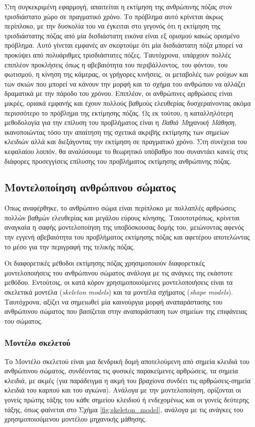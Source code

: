 Στη συγκεκριμένη εφαρμογή, απαιτείται η εκτίμηση της ανθρώπινης πόζας στον τρισδιάστατο χώρο σε πραγματικό χρόνο. Το πρόβλημα αυτό κρίνεται άκρως περίπλοκο, με την δυσκολία του να έγκειται στο γεγονός ότι η εκτίμηση της τρισδιάστατης πόζας από μία δισδιάστατη εικόνα είναι εξ ορισμού κακώς ορισμένο πρόβλημα. Αυτό γίνεται εμφανές αν σκεφτούμε ότι μία δισδιάστατη πόζα μπορεί να προκύψει από πολυάριθμες τρισδιάστατες πόζες. Ταυτόχρονα, υπάρχουν πολλές επιπλέον προκλήσεις όπως η αβεβαιότητα του περιβάλλοντος, του φόντου, του φωτισμού, η κίνηση της κάμερας, οι γρήγορες κινήσεις, οι μεταβολές των ρούχων και των σκιών που μπορεί να κάνουν την μορφή και το σχήμα του ανθρώπου να αλλάζει δραματικά με την πάροδο του χρόνου. Επιπλέον, οι ανθρώπινες αρθρώσεις είναι μικρές, οριακά εμφανής και έχουν πολλούς βαθμούς ελευθερίας δυσχεραίνοντας ακόμα περισσότερο το πρόβλημα της εκτίμησης πόζας. Ως εκ τούτου, η καταλληλότερη μεθοδολογία για την επίλυση του προβλήματος είναι η \textsl{Βαθιά Μηχανική Μάθηση}, ικανοποιώντας τόσο την απαίτηση της σχετικά ακριβής εκτίμησης των σημείων κλειδιών αλλά και διεξάγοντας την εκτίμηση σε πραγματικό χρόνο. Στη συνέχεια του κεφαλαίου λοιπόν, θα αναλύσουμε το θεωρητικό υπόβαθρο που συναντάει κανείς στις διάφορες προσεγγίσεις επίλυσης του προβλήματος εκτίμησης ανθρώπινης πόζας.

\subsection{Μοντελοποίηση ανθρώπινου σώματος}

Όπως αναφέρθηκε, το ανθρώπινο σώμα είναι περίπλοκο με πολλαπλές αρθρώσεις πολλών βαθμών ελευθερίας και μεγάλου εύρους κίνησης. Τοιουτοτρόπως, κρίνεται αναγκαία η σαφής μοντελοποίηση της υποβόσκουσας δομής του, μειώνοντας αφενός την εγγενή αβεβαιότητα του προβλήματος εκτίμησης πόζας και αφετέρου αποτελώντας το μέσο για την περιγραφή της τελικής πόζας.

Οι διαφορετικές μέθοδοι εκτίμησης πόζας χρησιμοποιούν διαφορετικές μοντελοποιήσεις του ανθρώπινου σώματος ανάλογα με τις ανάγκες της εκάστοτε μεθόδου. Εντούτοις, οι κατά κόρον χρησιμοποιούμενες μοντελοποιήσεις είναι τα σκελετικά μοντέλα (\textsl{skeleton models}) και τα μοντέλα σχήματος (\textsl{shape models}). Ταυτόχρονα, αξίζει να σημειωθεί μία καινούργια μορφή αναπαράστασης του ανθρώπινου σώματος που βασίζεται στην αναπαράσταση των σημείων της επιφάνειας του σώματος. \cite{densepose_paper}

\subsubsection{Μοντέλο σκελετού}
\label{section:skeleton_model}
Το Μοντέλο σκελετού είναι μια δενδρική δομή αποτελούμενη από σημεία κλειδιά του ανθρώπινου σώματος, συνδέοντας τις φυσικές παρακείμενες αρθρώσεις, τα σημεία κλειδιά, με ακμές (για παράδειγμα η ακμή του βραχίονα συνδέει τις αρθρώσεις-σημεία κλειδιά του καρπού και του αγκώνα). Ανάλογα με την μοντελοποίηση, ορίζονται οι γονείς πρώτης τάξης του κάθε σημείου κλειδιού ή ενδεχομένως και οι γονείς δεύτερης τάξης, όπως φαίνεται στο Σχήμα \ref{fig:skeleton_model}, ανάλογα με τις ανάγκες του χρησιμοποιούμενου μοντέλου μηχανικής μάθησης.
    
